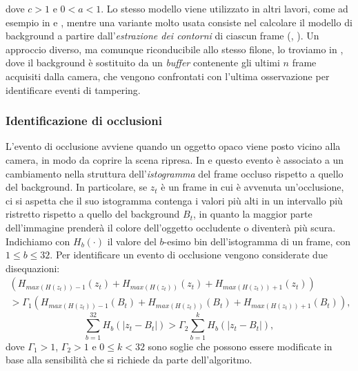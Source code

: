   dove $c > 1$ e $0<a<1$.
  Lo stesso modello viene utilizzato in altri lavori, come ad esempio in \cite{saglam2009real} e \cite{tsesmelis2013tamper}, mentre una variante molto usata consiste nel calcolare il modello di background a partire dall'\textit{estrazione dei contorni} di ciascun frame (\cite{harasse2004automated}, \cite{gil2007automatic}).
  Un approccio diverso, ma comunque riconducibile allo stesso filone, lo troviamo in \cite{ribnick2006real}, dove il background \`e sostituito da un \textit{buffer} contenente gli ultimi $n$ frame acquisiti dalla camera, che vengono confrontati con l'ultima osservazione per identificare eventi di tampering.
\subsubsection{Identificazione di occlusioni}
L'evento di occlusione avviene quando un oggetto opaco viene posto vicino alla camera, in modo da coprire la scena ripresa.
In \cite{aksay2007camera} e \cite{saglam2009real} questo evento \`e associato a un cambiamento nella struttura dell'\textit{istogramma} del frame occluso rispetto a quello del background.
In particolare, se $z_t$ \`e un frame in cui \`e avvenuta un'occlusione, ci si aspetta che il suo istogramma contenga i valori pi\`u alti in un intervallo pi\`u ristretto rispetto a quello del background $B_t$, in quanto la maggior parte dell'immagine prender\`a il colore dell'oggetto occludente o diventer\`a pi\`u scura.\\
Indichiamo con $H_b(\cdot)$ il valore del $b$-esimo bin dell'istogramma di un frame, con $1 \leq b \leq 32$.
Per identificare un evento di occlusione vengono considerate due disequazioni:
\begin{eqnarray}
 \left(H_{max\left(H(z_t)\right)-1}(z_t) + H_{max\left(H(z_t)\right)}(z_t) +  H_{max\left(H(z_t)\right) + 1}(z_t)\right) \nonumber \\
 > \Gamma_1 \left(H_{max\left(H(z_t)\right)-1}(B_t) + H_{max\left(H(z_t)\right)}(B_t)
  +  H_{max\left(H(z_t)\right) + 1}(B_t)\right), \nonumber
\end{eqnarray}
\[ \sum_{b=1}^{32} H_b\left(|z_t - B_t|\right) > \Gamma_2 \sum_{b=1}^{k}H_b\left(|z_t - B_t|\right),\]
dove $\Gamma_1 > 1$, $\Gamma_2 > 1$ e $0 \leq k < 32$ sono soglie che possono essere modificate in base alla sensibilit\`a che si richiede da parte dell'algoritmo.\\
